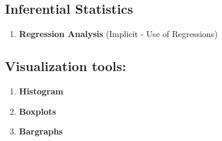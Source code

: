 \documentclass{article}
\begin{document}
\subsection*{Inferential Statistics}
\begin{enumerate}
    \item  \textbf{Regression Analysis} (Implicit - Use of Regressions)
\end{enumerate}

\subsection*{Visualization tools:}
\begin{enumerate}
  \item \textbf{Histogram}
  \item \textbf{Boxplots}
  \item \textbf{Bargraphs}
\end{enumerate}
\end{document}
